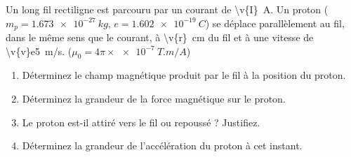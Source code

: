 Un long fil rectiligne est parcouru par un courant de \qty{\v{I}}{A}. Un proton ($m_p = \qty{1.673e-27}{kg}$, $e = \qty{1.602e-19}{C}$) se déplace parallèlement au fil, dans le même sens que le courant, à \qty{\v{r}}{cm} du fil et à une vitesse de \qty{\v{v}e5}{m/s}. ($\mu_0 = 4\pi \times \qty{e-7}{T.m/A}$)

\begin{enumerate}[label=\alph*)]
    \item Déterminez le champ magnétique produit par le fil à la position du proton.
    \item Déterminez la grandeur de la force magnétique sur le proton.
    \item Le proton est-il attiré vers le fil ou repoussé ? Justifiez.
    \item Déterminez la grandeur de l'accélération du proton à cet instant.
\end{enumerate}
